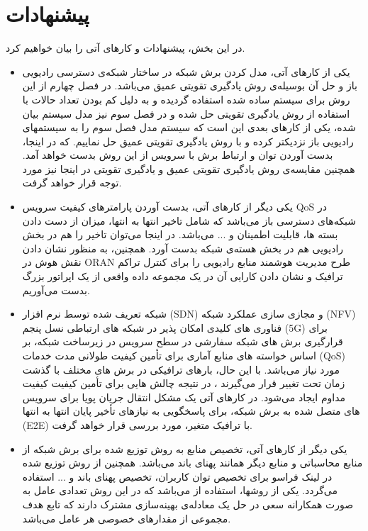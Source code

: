  \section{پیشنهادات}
 در این بخش، پیشنهادات و کارهای آتی را بیان خواهیم کرد.
 \begin{itemize}
\item
 یکی از کارهای آتی، مدل کردن برش شبکه در ساختار شبکه‌ی دسترسی رادیویی باز و حل آن بوسیله‌ی روش یادگیری تقویتی عمیق می‌باشد. در فصل چهارم از این روش برای سیستم ساده شده استفاده گردیده و به دلیل کم بودن تعداد حالات با استفاده از روش یادگیری تقویتی حل شده و در فصل سوم نیز مدل سیستم بیان شده، یکی از کارهای بعدی این است که سیستم مدل فصل سوم را به سیستمهای رادیویی باز نزدیکتر کرده و
با روش یادگیری تقویتی عمیق حل نماییم. که در اینجا، بدست آوردن توان و ارتباط برش با سرویس از این روش بدست خواهد آمد. همچنین مقایسه‌ی روش یادگیری تقویتی عمیق و یادگیری تقویتی در اینجا نیز مورد توجه قرار خواهد گرفت.
\item 
یکی دیگر از کارهای آتی، بدست آوردن پارامترهای کیفیت سرویس QoS
در شبکه‌های دسترسی باز می‌باشد که شامل تاخیر انتها به انتها، میزان از دست دادن بسته ها،
قابلیت اطمینان و ... می‌باشد.
در اینجا می‌توان تاخیر را هم در بخش رادیویی هم در بخش هسته‌ی شبکه بدست آورد. 
همچنین،
به منظور نشان دادن نقش هوش در ORAN طرح مدیریت هوشمند منابع رادیویی را برای کنترل تراکم ترافیک و نشان دادن کارایی آن در یک مجموعه داده واقعی از یک اپراتور بزرگ بدست می‌آوریم.
\item 
شبکه تعریف شده توسط نرم افزار (SDN) و مجازی سازی عملکرد شبکه (NFV) فناوری های کلیدی امکان پذیر در شبکه های ارتباطی نسل پنجم (5G) برای قرارگیری برش های شبکه سفارشی در سطح سرویس در زیرساخت شبکه، بر اساس خواسته های منابع آماری برای تأمین کیفیت طولانی مدت خدمات (QoS) مورد نیاز می‌باشد. با این حال، بارهای ترافیکی در برش های مختلف با گذشت زمان تحت تغییر قرار می‌گیرند ، در نتیجه چالش هایی برای تأمین کیفیت کیفیت مداوم ایجاد می‌شود.
در کارهای آتی یک مشکل انتقال جریان پویا برای سرویس های متصل شده به برش شبکه، برای پاسخگویی به نیازهای تأخیر پایان انتها به انتها (E2E) با ترافیک متغیر، مورد بررسی قرار خواهد گرفت.
\item
یکی دیگر از کارهای آتی، تخصیص منابع به روش توزیع شده برای برش شبکه از منابع محاسباتی و منابع دیگر همانند پهنای باند می‌باشد.
همچنین از روش توزیع شده در لینک فراسو  
برای تخصیص توان کاربران، تخصیص پهنای باند و ... استفاده می‌گردد. یکی از روشها، استفاده از 
می‌باشد که در این روش تعدادی عامل به صورت همکارانه سعی در حل یک معادله‌ی بهینه‌سازی مشترک دارند که تابع هدف مجموعی از مقدارهای خصوصی هر عامل ‌می‌باشد. 
 \end{itemize}
 
  